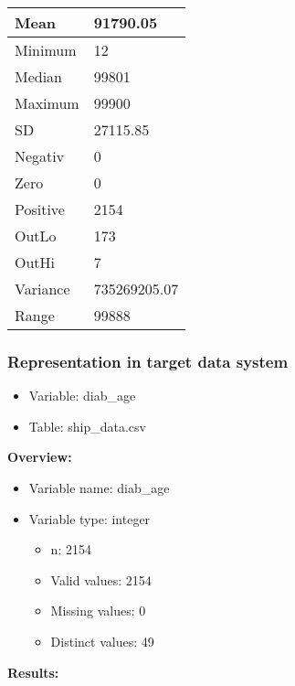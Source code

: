\documentclass[
]{article}
\providecommand{\tightlist}{%
  \setlength{\itemsep}{0pt}\setlength{\parskip}{0pt}}
\begin{document}
\begin{table}[H]
\centering
\begin{tabular}{l|l}
\hline
Mean & 91790.05\\
\hline
Minimum & 12\\
\hline
Median & 99801\\
\hline
Maximum & 99900\\
\hline
SD & 27115.85\\
\hline
Negativ & 0\\
\hline
Zero & 0\\
\hline
Positive & 2154\\
\hline
OutLo & 173\\
\hline
OutHi & 7\\
\hline
Variance & 735269205.07\\
\hline
Range & 99888\\
\hline
\end{tabular}
\end{table}
\newpage

\hypertarget{representation-in-target-data-system-8}{%
\subsubsection{\texorpdfstring{Representation in \textbf{target} data
system}{Representation in target data system}}\label{representation-in-target-data-system-8}}

\begin{itemize}
\tightlist
\item
  Variable: diab\_age
\item
  Table: ship\_data.csv
\end{itemize}

\textbf{Overview:}

\begin{itemize}
\tightlist
\item
  Variable name: diab\_age
\item
  Variable type: integer

  \begin{itemize}
  \tightlist
  \item
    n: 2154
  \item
    Valid values: 2154
  \item
    Missing values: 0
  \item
    Distinct values: 49
  \end{itemize}
\end{itemize}

\textbf{Results:}\\
\end{document}
